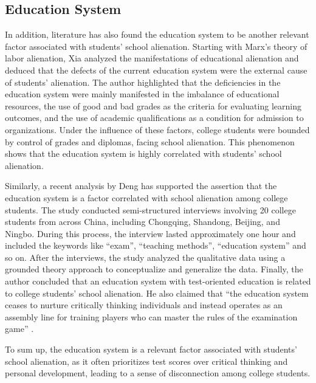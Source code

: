 \documentclass{scupi_apa_thesis}
\begin{document}
\subsection{Education System}
\par
In addition, literature has also found the education system to be another relevant factor associated with students' school alienation. 
Starting with Marx's theory of labor alienation, Xia \citeyear{xia2024jiaoyu} analyzed the manifestations of educational alienation and deduced that the defects of the current education system were the external cause of students' alienation. 
The author highlighted that the deficiencies in the education system were mainly manifested in the imbalance of educational resources, the use of good and bad grades as the criteria for evaluating learning outcomes, and the use of academic qualifications as a condition for admission to organizations. 
Under the influence of these factors, college students were bounded by control of grades and diplomas, facing school alienation. 
This phenomenon shows that the education system is highly correlated with students' school alienation.
\par
Similarly, a recent analysis by Deng \citeyear{deng2024interdependence} has supported the assertion that the education system is a factor correlated with school alienation among college students. 
The study conducted semi-structured interviews involving 20 college students from across China, including Chongqing, Shandong, Beijing, and Ningbo. 
During this process, the interview lasted approximately one hour and included the keywords like “exam”, “teaching methods”, “education system” and so on. 
After the interviews, the study analyzed the qualitative data using a grounded theory approach to conceptualize and generalize the data. 
Finally, the author concluded that an education system with test-oriented education is related to college students' school alienation. 
He also claimed that “the education system ceases to nurture critically thinking individuals and instead operates as an assembly line for training players who can master the rules of the examination game” \cite{deng2024interdependence}.
\par
To sum up, the education system is a relevant factor associated with students' school alienation, as it often prioritizes test scores over critical thinking and personal development, leading to a sense of disconnection among college students.
\end{document}
